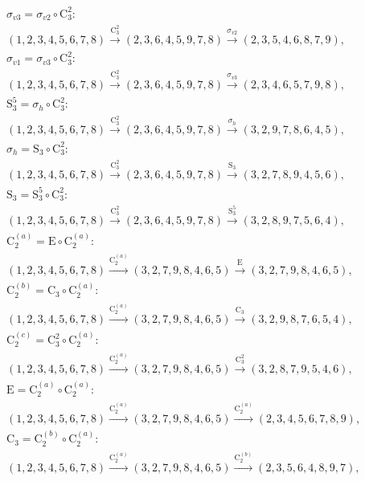 \begin{align*}
& \sigma_{v3} = \sigma_{v2} \circ \mathrm{C}_{3}^{2}:\; \\& (1,2,3,4,5,6,7,8) \xrightarrow{\mathrm{C}_{3}^{2}} (2,3,6,4,5,9,7,8) \xrightarrow{\sigma_{v2}} (2,3,5,4,6,8,7,9), \\
& \sigma_{v1} = \sigma_{v3} \circ \mathrm{C}_{3}^{2}:\; \\& (1,2,3,4,5,6,7,8) \xrightarrow{\mathrm{C}_{3}^{2}} (2,3,6,4,5,9,7,8) \xrightarrow{\sigma_{v3}} (2,3,4,6,5,7,9,8), \\
& \mathrm{S}_{3}^{5} = \sigma_{h} \circ \mathrm{C}_{3}^{2}:\; \\& (1,2,3,4,5,6,7,8) \xrightarrow{\mathrm{C}_{3}^{2}} (2,3,6,4,5,9,7,8) \xrightarrow{\sigma_{h}} (3,2,9,7,8,6,4,5), \\
& \sigma_{h} = \mathrm{S}_{3} \circ \mathrm{C}_{3}^{2}:\; \\& (1,2,3,4,5,6,7,8) \xrightarrow{\mathrm{C}_{3}^{2}} (2,3,6,4,5,9,7,8) \xrightarrow{\mathrm{S}_{3}} (3,2,7,8,9,4,5,6), \\
& \mathrm{S}_{3} = \mathrm{S}_{3}^{5} \circ \mathrm{C}_{3}^{2}:\; \\& (1,2,3,4,5,6,7,8) \xrightarrow{\mathrm{C}_{3}^{2}} (2,3,6,4,5,9,7,8) \xrightarrow{\mathrm{S}_{3}^{5}} (3,2,8,9,7,5,6,4), \\
& \mathrm{C}_{2}^{(a)} = \mathrm{E} \circ \mathrm{C}_{2}^{(a)}:\; \\& (1,2,3,4,5,6,7,8) \xrightarrow{\mathrm{C}_{2}^{(a)}} (3,2,7,9,8,4,6,5) \xrightarrow{\mathrm{E}} (3,2,7,9,8,4,6,5), \\
& \mathrm{C}_{2}^{(b)} = \mathrm{C}_{3} \circ \mathrm{C}_{2}^{(a)}:\; \\& (1,2,3,4,5,6,7,8) \xrightarrow{\mathrm{C}_{2}^{(a)}} (3,2,7,9,8,4,6,5) \xrightarrow{\mathrm{C}_{3}} (3,2,9,8,7,6,5,4), \\
& \mathrm{C}_{2}^{(c)} = \mathrm{C}_{3}^{2} \circ \mathrm{C}_{2}^{(a)}:\; \\& (1,2,3,4,5,6,7,8) \xrightarrow{\mathrm{C}_{2}^{(a)}} (3,2,7,9,8,4,6,5) \xrightarrow{\mathrm{C}_{3}^{2}} (3,2,8,7,9,5,4,6), \\
& \mathrm{E} = \mathrm{C}_{2}^{(a)} \circ \mathrm{C}_{2}^{(a)}:\; \\& (1,2,3,4,5,6,7,8) \xrightarrow{\mathrm{C}_{2}^{(a)}} (3,2,7,9,8,4,6,5) \xrightarrow{\mathrm{C}_{2}^{(a)}} (2,3,4,5,6,7,8,9), \\
& \mathrm{C}_{3} = \mathrm{C}_{2}^{(b)} \circ \mathrm{C}_{2}^{(a)}:\; \\& (1,2,3,4,5,6,7,8) \xrightarrow{\mathrm{C}_{2}^{(a)}} (3,2,7,9,8,4,6,5) \xrightarrow{\mathrm{C}_{2}^{(b)}} (2,3,5,6,4,8,9,7), \\

\end{align*}

